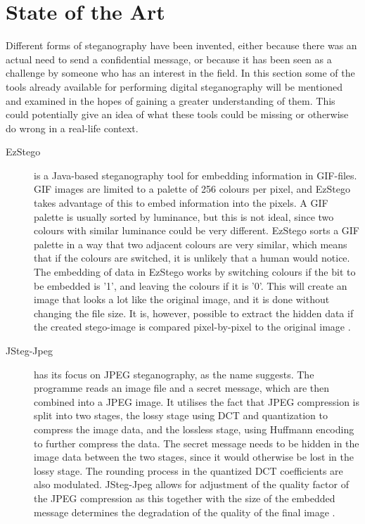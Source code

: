 \section{State of the Art}
\label{sec:SOTA}
Different forms of steganography have been invented, either because there was an actual need to send a confidential message, or because it has been seen as a challenge by someone who has an interest in the field.
In this section some of the tools already available for performing digital steganography will be mentioned and examined in the hopes of gaining a greater understanding of them.
This could potentially give an idea of what these tools could be missing or otherwise do wrong in a real-life context.

\begin{description}
	\item[EzStego] is a Java-based steganography tool for embedding information in GIF-files.
	GIF images are limited to a palette of 256 colours per pixel, and EzStego takes advantage of this to embed information into the pixels.
	A GIF palette is usually sorted by luminance, but this is not ideal, since two colours with similar luminance could be very different.
	EzStego sorts a GIF palette in a way that two adjacent colours are very similar, which means that if the colours are switched, it is unlikely that a 		human would notice.
	The embedding of data in EzStego works by switching colours if the bit to be embedded is '1', and leaving the colours if it is '0'.
	This will create an image that looks a lot like the original image, and it is done without changing the file size.
	It is, however, possible to extract the hidden data if the created stego-image is compared pixel-by-pixel to the original image \citep{Westfeld2000}.

	\item[JSteg-Jpeg] has its focus on JPEG steganography, as the name suggests.
	The programme reads an image file and a secret message, which are then combined into a JPEG image.
	It utilises the fact that JPEG compression is split into two stages, the lossy stage using DCT and quantization to compress the image data, and the			lossless stage, using Huffmann encoding to further compress the data.
	The secret message needs to be hidden in the image data between the two stages, since it would otherwise be lost in the lossy stage.
	The rounding process in the quantized DCT coefficients are also modulated.
	JSteg-Jpeg allows for adjustment of the quality factor of the JPEG compression as this together with the size of the embedded message determines the 		degradation of the quality of the final image \citep{ImageProcessingFrankY}.
	

\end{description}
